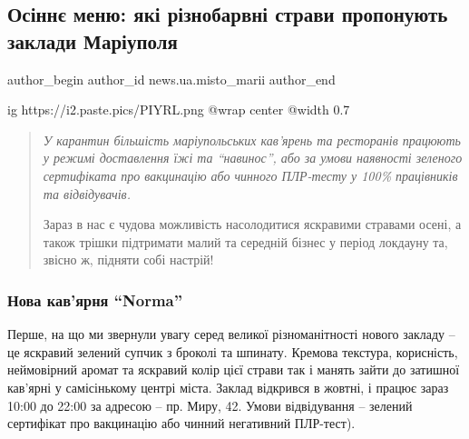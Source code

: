  
 
 
 
 
 
\subsection{Осіннє меню: які різнобарвні страви пропонують заклади Маріуполя}
\label{sec:25_10_2021.stz.news.ua.misto_marii.1.osinne_menu}
 
\ifcmt
 author_begin
   author_id news.ua.misto_marii
 author_end
\fi

\ifcmt
  ig https://i2.paste.pics/PIYRL.png
  @wrap center
  @width 0.7
\fi

\begin{quote}
\em
У карантин більшість маріупольських кав'ярень та ресторанів працюють у режимі
доставлення їжі та \enquote{навинос}, або за умови наявності зеленого сертифіката про
вакцинацію або чинного ПЛР-тесту у 100\% працівників та відвідувачів.

Зараз в нас є чудова можливість насолодитися яскравими стравами осені, а також
трішки підтримати малий та середній бізнес у період локдауну та, звісно ж,
підняти собі настрій!
\end{quote}

\subsubsection{Нова кав'ярня \enquote{Norma}}


Перше, на що ми звернули увагу серед великої різноманітності нового закладу –
це яскравий зелений супчик з броколі та шпинату. Кремова текстура, корисність,
неймовірний аромат та яскравий колір цієї страви так і манять зайти до затишної
кав'ярні у самісінькому центрі міста. Заклад відкрився в жовтні, і працює зараз
10:00 до 22:00 за адресою – пр. Миру, 42. Умови відвідування – зелений
сертифікат про вакцинацію або чинний негативний ПЛР-тест).

